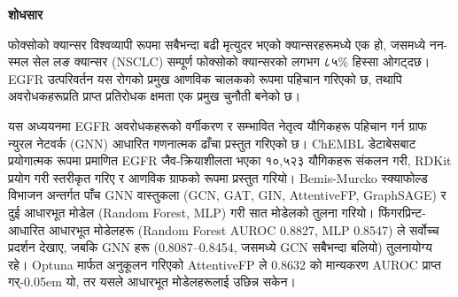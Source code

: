 
\cleardoublepage

\begin{center}
  {\fontsize{18}{22}\selectfont\bfseries{\nepalifont शोधसार}}
\end{center}
\thispagestyle{plain}

\vspace{1cm}

{\fontsize{12}{18}\selectfont

{\nepalifont फोक्सोको क्यान्सर विश्वव्यापी रूपमा सबैभन्दा बढी
मृत्युदर भएको क्यान्सरहरूमध्ये एक हो, जसमध्ये
नन-स्मल सेल लङ क्यान्सर}
(NSCLC)
{\nepalifont सम्पूर्ण फोक्सोको क्यान्सरको लगभग ८५\% हिस्सा
ओगट्दछ।}
EGFR
{\nepalifont उत्परिवर्तन यस रोगको प्रमुख आणविक चालकको रूपमा
पहिचान गरिएको छ, तथापि अवरोधकहरूप्रति प्राप्त प्रतिरोधक
क्षमता एक प्रमुख चुनौती बनेको छ।}

\vspace{0.3em}

{\nepalifont यस अध्ययनमा}
EGFR
{\nepalifont अवरोधकहरूको वर्गीकरण र सम्भावित नेतृत्व यौगिकहरू
पहिचान गर्न ग्राफ न्युरल नेटवर्क}
(GNN)
{\nepalifont आधारित गणनात्मक ढाँचा प्रस्तुत गरिएको छ।}
ChEMBL
{\nepalifont डेटाबेसबाट प्रयोगात्मक रूपमा प्रमाणित}
EGFR
{\nepalifont जैव-क्रियाशीलता भएका १०,५२३ यौगिकहरू संकलन गरी,}
RDKit
{\nepalifont प्रयोग गरी स्तरीकृत गरिए र आणविक ग्राफको रूपमा
प्रस्तुत गरियो।}
Bemis-Murcko
{\nepalifont स्क्याफोल्ड विभाजन अन्तर्गत पाँच}
GNN
{\nepalifont वास्तुकला}
(GCN, GAT, GIN, AttentiveFP, GraphSAGE)
{\nepalifont र दुई आधारभूत मोडेल}
(Random Forest, MLP)
{\nepalifont गरी सात मोडेलको तुलना गरियो।}
{\nepalifont फिंगरप्रिन्ट-आधारित आधारभूत मोडेलहरू}
(Random Forest
{\nepalifont AUROC}
0.8827,
MLP
0.8547)
{\nepalifont ले सर्वोच्च प्रदर्शन देखाए, जबकि}
GNN
{\nepalifont हरू}
(0.8087--0.8454,
{\nepalifont जसमध्ये}
GCN
{\nepalifont सबैभन्दा बलियो})
{\nepalifont तुलनायोग्य रहे।}
Optuna
{\nepalifont मार्फत अनुकूलन गरिएको}
AttentiveFP
{\nepalifont ले}
0.8632
{\nepalifont को मान्यकरण}
AUROC
{\nepalifont प्राप्त गर्\kern-0.05em यो, तर यसले आधारभूत मोडेलहरूलाई
उछिन्न सकेन।}

}
